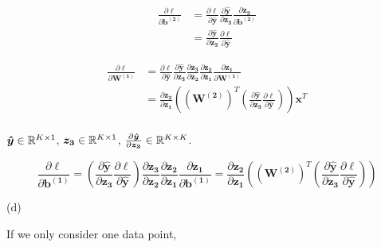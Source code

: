 

\begin{align}
    \frac{\partial \ell}{\partial \bm{b^{(2)}}} 
    &= \frac{\partial \ell}{\partial \bm{\hat y}} \frac{\partial \bm{\hat y}}{\partial \bm{z_3}} \frac{\partial \bm{z_3}}{\partial \bm{b^{(2)}}}  \\
    &= \frac{\partial \bm{\hat y}}{\partial \bm{z_3}}   \frac{\partial \ell}{\partial \bm{\hat y}} 
\end{align}

\begin{align}
    \frac{\partial \ell}{\partial \bm{W^{(1)}}} 
    &= \frac{\partial \ell}{\partial \bm{\hat y}} \frac{\partial \bm{\hat y}}{\partial \bm{z_3}} \frac{\partial \bm{z_3}}{\partial \bm{z_2}} \frac{\partial \bm{z_2}}{\partial \bm{z_1}} \frac{\partial \bm{z_1}}{\partial \bm{W^{(1)}}}  \\
    &= \frac{\partial \bm{z_2}}{\partial \bm{z_1}}  (\bm{(W^{(2)})}^T ( \frac{\partial \bm{\hat y}}{\partial \bm{z_3}} \frac{\partial \ell}{\partial \bm{\hat y}})) \bm{x}^T\\ 
\end{align}


$\bm{\hat y} \in \mathbb{R}^{K \times 1}$, $\bm{z_3} \in \mathbb{R}^{K \times 1}$, $\frac{\partial \bm{\hat y}}{\partial \bm{z_3}} \in \mathbb{R}^{K \times K}$.

\begin{equation}
    \frac{\partial \ell}{\partial \bm{b^{(1)}}} = (\frac{\partial \bm{\hat y}}{\partial \bm{z_3}} \frac{\partial \ell}{\partial \bm{\hat y}} ) \frac{\partial \bm{z_3}}{\partial \bm{z_2}} \frac{\partial \bm{z_2}}{\partial \bm{z_1}} \frac{\partial \bm{z_1}}{\partial \bm{b^{(1)}}} = \frac{\partial \bm{z_2}}{\partial \bm{z_1}}  (\bm{(W^{(2)})}^T ( \frac{\partial \bm{\hat y}}{\partial \bm{z_3}} \frac{\partial \ell}{\partial \bm{\hat y}})) 
\end{equation}


(d)




If we only consider one data point,

